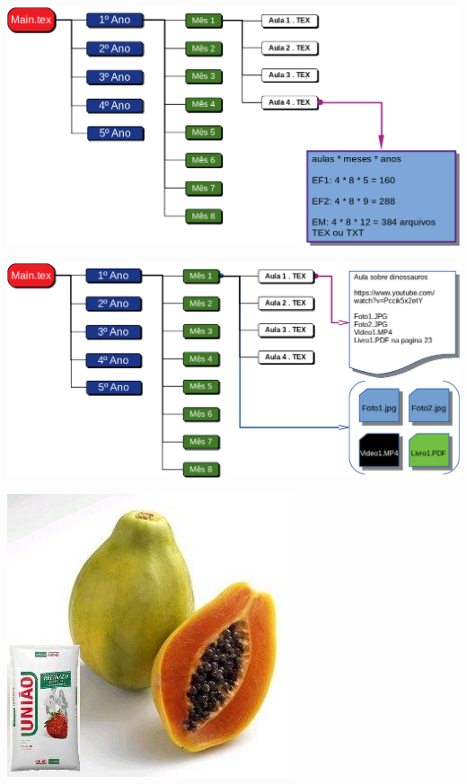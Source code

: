 \begin{center}
	\includegraphics[height=\textheight]{./IMG-GIT/SVG/DIAGRAMAS5.png}
\end{center}
\pagebreak

\begin{center}
	\includegraphics[width=\linewidth]{./IMG-GIT/SVG/DIAGRAMAS6.png}
\end{center}
\pagebreak


\begin{center}
	\includegraphics[height=\textheight]{./IMG-GIT/mamao.jpg}
\end{center}
\pagebreak

